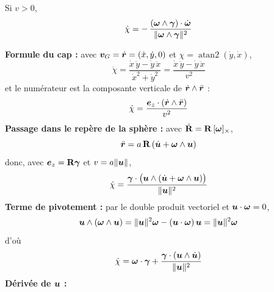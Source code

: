 \begin{proposition}
    Si $v > 0$,
    \begin{equation}
        \dot{\chi} = -\,\frac{(\bm{\omega}\wedge\bm{\gamma})\cdot\dot{\bm{\omega}}}
        {\|\bm{\omega}\wedge\bm{\gamma}\|^2}
    \end{equation}
\end{proposition}

\begin{demonstration}
    
    \textbf{Formule du cap : }
    avec $\bm{v}_G = \dot{\bm{r}} = (\dot{x}, \dot{y}, 0)$ et $\chi = \operatorname{atan2}(\dot{y}, \dot{x})$,
    \begin{equation*}
        \dot{\chi} = \frac{\dot{x}\,\ddot{y} - \dot{y}\,\ddot{x}}{\dot{x}^2 + \dot{y}^2}
        = \frac{\dot{x}\,\ddot{y} - \dot{y}\,\ddot{x}}{v^2}
    \end{equation*}
    et le numérateur est la composante verticale de $\dot{\bm{r}}\wedge\ddot{\bm{r}}$ :
    \begin{equation*}
        \dot{\chi} = \frac{\bm{e}_z\cdot(\dot{\bm{r}}\wedge\ddot{\bm{r}})}{v^2}
    \end{equation*}
    \textbf{Passage dans le repère de la sphère : }
    avec $\dot{\mathbf{R}} = \mathbf{R}\,[\bm{\omega}]_{\times}$,
    \begin{equation*}
        \ddot{\bm{r}} = a\,\mathbf{R}\,(\dot{\bm{u}} + \bm{\omega}\wedge\bm{u})
    \end{equation*}
    donc, avec $\bm{e}_z = \mathbf{R}\bm{\gamma}$ et $v = a\|\bm{u}\|$,
    \begin{equation*}
        \dot{\chi} = \frac{\bm{\gamma}\cdot\big(\bm{u}\wedge(\dot{\bm{u}} + \bm{\omega}\wedge\bm{u})\big)}{\|\bm{u}\|^2}
    \end{equation*}
    \textbf{Terme de pivotement : }
    par le double produit vectoriel et $\bm{u}\cdot\bm{\omega} = 0$,
    \begin{equation*}
        \bm{u}\wedge(\bm{\omega}\wedge\bm{u})
        = \|\bm{u}\|^2\bm{\omega} - (\bm{u}\cdot\bm{\omega})\,\bm{u}
        = \|\bm{u}\|^2\bm{\omega}
    \end{equation*}
    d'où
    \begin{equation*}
        \dot{\chi} = \bm{\omega}\cdot\bm{\gamma}
        + \frac{\bm{\gamma}\cdot(\bm{u}\wedge\dot{\bm{u}})}{\|\bm{u}\|^2}
    \end{equation*}
    \textbf{Dérivée de $\bm{u}$ : }

\end{demonstration}
